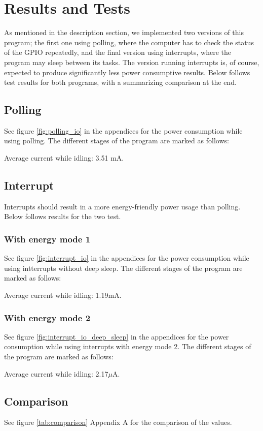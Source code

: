 \section{Results and Tests}

As mentioned in the description section, we implemented two versions of this program; the first one using polling, where the computer has to check the status of the GPIO repeatedly, and the final version using interrupts, where the program may sleep between its tasks. The version running interrupts is, of course, expected to produce significantly less power consumptive results. Below follows test results for both programs, with a summarizing comparison at the end.

\subsection{Polling}

See figure \ref{fig:polling_io} in the appendices for the power consumption while using polling. The different stages of the program are marked as follows:

Average current while idling: 3.51 mA.

\subsection{Interrupt}

Interrupts should result in a more energy-friendly power usage than polling. Below follows results for the two test.

\subsubsection{With energy mode 1}

See figure \ref{fig:interrupt_io} in the appendices for the power consumption while using intterrupts without deep sleep. The different stages of the program are marked as follows:

Average current while idling: 1.19mA.

\subsubsection{With energy mode 2}

See figure \ref{fig:interrupt_io_deep_sleep} in the appendices for the power consumption while using interrupts with energy mode 2. The different stages of the program are marked as follows:

Average current while idling: 2.17$\mu$A.

\subsection{Comparison}

See figure \ref{tab:comparison} Appendix A for the comparison of the values.
